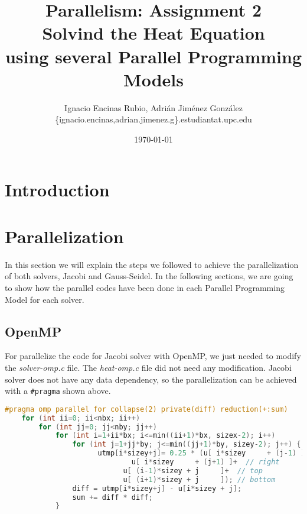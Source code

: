 \documentclass[a4paper, 10pt]{article}
\title{\textbf{Parallelism: Assignment 2\\Solvind the Heat Equation \\using several Parallel Programming Models}}
\author{Ignacio Encinas Rubio, Adrián Jiménez González\\\{ignacio.encinas,adrian.jimenez.g\}.estudiantat.upc.edu}
\date{\normalsize\today{}}
\begin{document}
\maketitle

  
  

\section{Introduction}

\section{Parallelization}

In this section we will explain the steps we followed to achieve the parallelization of both solvers, Jacobi and Gauss-Seidel. In the following sections, we are going to show how the parallel codes have been done in each Parallel Programming Model for each solver.

\subsection{OpenMP}

  For parallelize the code for Jacobi solver with OpenMP, we just needed to modify the \textit{solver-omp.c} file. The \textit{heat-omp.c} file did not need any modification. Jacobi solver does not have any data dependency, so the parallelization can be achieved with a \texttt{\#pragma} shown above.

\begin{lstlisting}[language=c, caption={OpenMP pragma for Jacobi parallelization}]
    #pragma omp parallel for collapse(2) private(diff) reduction(+:sum)
    for (int ii=0; ii<nbx; ii++)
        for (int jj=0; jj<nby; jj++) 
            for (int i=1+ii*bx; i<=min((ii+1)*bx, sizex-2); i++) 
                for (int j=1+jj*by; j<=min((jj+1)*by, sizey-2); j++) {
	                  utmp[i*sizey+j]= 0.25 * (u[ i*sizey     + (j-1) ]+  // left
					          u[ i*sizey     + (j+1) ]+  // right
				            u[ (i-1)*sizey + j     ]+  // top
				            u[ (i+1)*sizey + j     ]); // bottom
	            diff = utmp[i*sizey+j] - u[i*sizey + j];
	            sum += diff * diff; 
	        }
\end{lstlisting}
\end{document}
